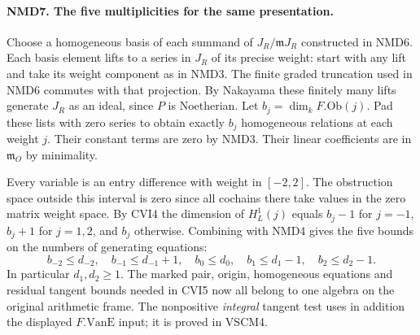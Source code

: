 \paragraph{NMD7. The five multiplicities for the same presentation.}
\label{claim:NMD7}
Choose a homogeneous basis of each summand of $J_R/\mathfrak mJ_R$
constructed in NMD6. Each basis element lifts to a series in $J_R$
of its precise weight: start with any lift and take its
weight component as in NMD3. The finite graded truncation used in
NMD6 commutes with that projection. By Nakayama these finitely many
lifts generate $J_R$ as an ideal, since $P$ is Noetherian.
Let $b_j=\dim_k F.\mathrm{Ob}(j)$. Pad these lists with zero
series to obtain exactly $b_j$ homogeneous relations at each weight
$j$. Their constant terms are zero by NMD3. Their linear
coefficients are in $\mathfrak m_O$ by minimality.

Every variable is an entry difference with weight in $[-2,2]$.
The obstruction space outside this interval is zero since all
cochains there take values in the zero matrix weight space.
By CVI4 the dimension of $H^1_L(j)$ equals $b_j-1$ for $j=-1$,
$b_j+1$ for $j=1,2$, and $b_j$ otherwise. Combining with NMD4
gives the five bounds on the numbers of generating equations:
\[
 b_{-2}\le d_{-2},\quad b_{-1}\le d_{-1}+1,\quad
 b_0\le d_0,\quad b_1\le d_1-1,\quad b_2\le d_2-1.
\]
In particular $d_1,d_2\ge1$. The marked pair, origin, homogeneous
equations and residual tangent bounds needed in CVI5 now all belong
to one algebra on the original arithmetic frame. The nonpositive
\emph{integral} tangent test uses in addition the displayed
$F.\mathrm{VanE}$ input; it is proved in VSCM4.
